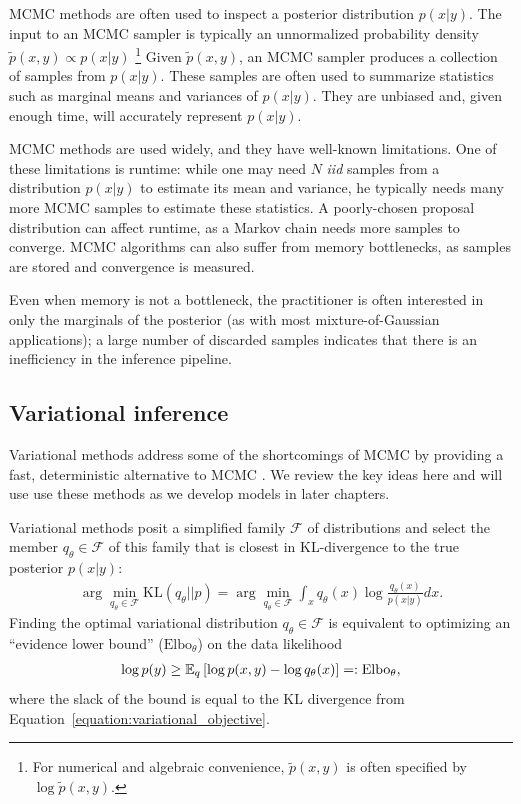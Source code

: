MCMC methods are often used to inspect a posterior distribution $p(x |
y)$.  The input to an MCMC sampler is typically an unnormalized
probability density $\tilde p(x, y) \propto p(x | y)$ \footnote{For
  numerical and algebraic convenience, $\tilde p(x, y)$ is often
  specified by $\log \tilde p(x, y)$.}  Given $\tilde p(x, y)$, an
MCMC sampler produces a collection of samples from $p(x | y)$.  These
samples are often used to summarize statistics such as marginal means
and variances of $p(x | y)$.  They are unbiased and, given enough
time, will accurately represent $p(x | y)$.

MCMC methods are used widely, and they have well-known limitations.
One of these limitations is runtime: while one may need $N$ \emph{iid}
samples from a distribution $p(x | y)$ to estimate its mean and
variance, he typically needs many more MCMC samples to estimate these
statistics.  A poorly-chosen proposal distribution can affect runtime,
as a Markov chain needs more samples to converge. MCMC algorithms can
also suffer from memory bottlenecks, as samples are stored and
convergence is measured.

Even when memory is not a bottleneck, the
practitioner is often interested in only the marginals of the
posterior (as with most mixture-of-Gaussian applications); a large
number of discarded samples indicates that there is an inefficiency in
the inference pipeline.

\subsection{Variational inference}
\label{section:variational_inference}

Variational methods address some of the shortcomings of MCMC by
providing a fast, deterministic alternative to MCMC
\cite{jordan:2003,jordan:1999}.  We review the key ideas here and will
use use these methods as we develop models in later chapters.

Variational methods posit a simplified
family $\mathcal{F}$ of distributions and select the member $q_\theta
\in \mathcal{F}$ of this family that is closest in KL-divergence to
the true posterior $p(x | y)$:
\begin{align}
  \arg \min_{q_\theta \in \mathcal{F}} \mbox{KL}(q_\theta || p) = \arg \min_{q_\theta \in \mathcal{F}} \int_x q_\theta(x) \log \frac{q_\theta(x)}{p(x | y)} dx.
  \label{equation:variational_objective}
\end{align}
Finding the optimal variational distribution $q_\theta \in
\mathcal{F}$ is equivalent to optimizing an ``evidence lower bound''
($\mbox{Elbo}_\theta$) on the data likelihood
\begin{eqnarray}
  \log p(y) \ge \mathbb{E}_q\left[\log p(x, y) - \log q_\theta(x)\right]
  =: \mbox{Elbo}_\theta,
  \label{equation:traditional_variational_objective}
\end{eqnarray}
where the slack of the bound is equal to the KL divergence from
Equation~\ref{equation:variational_objective}.

